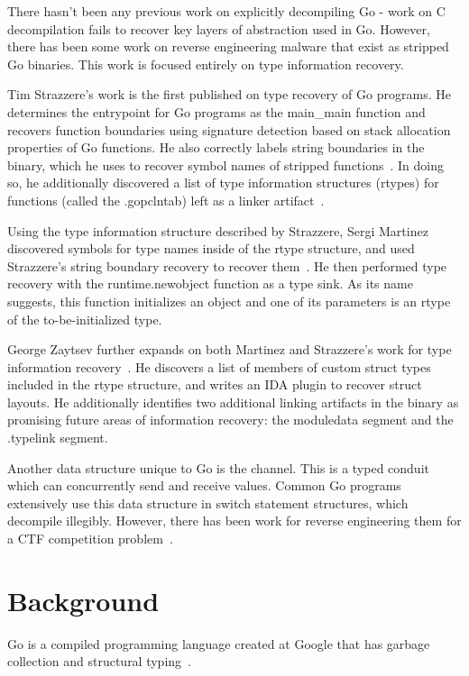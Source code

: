\documentclass[letterpaper,twocolumn,10pt]{article}
\begin{document}
There hasn’t been any previous work on explicitly decompiling Go - work on C decompilation fails to recover key layers of abstraction used in Go. However, there has been some work on reverse engineering malware that exist as stripped Go binaries. This work is focused entirely on type information recovery.

Tim Strazzere’s work is the first published on type recovery of Go programs. He determines the entrypoint for Go programs as the main\_main function and recovers function boundaries using signature detection based on stack allocation properties of Go functions. He also correctly labels string boundaries in the binary, which he uses to recover symbol names of stripped functions~\cite{rednaga}. In doing so, he additionally discovered a list of type information structures (rtypes) for functions (called the .gopclntab) left as a linker artifact~\cite{bsides}.

Using the type information structure described by Strazzere, Sergi Martinez discovered symbols for type names inside of the rtype structure, and used Strazzere’s string boundary recovery to recover them~\cite{martinez}. He then performed type recovery with the runtime.newobject function as a type sink. As its name suggests, this function initializes an object and one of its parameters is an rtype of the to-be-initialized type. 

George Zaytsev further expands on both Martinez and Strazzere’s work for type information recovery~\cite{zeronights}. He discovers a list of members of custom struct types included in the rtype structure, and writes an IDA plugin to recover struct layouts. He additionally identifies two additional linking artifacts in the binary as promising future areas of information recovery: the moduledata segment and the .typelink segment.

Another data structure unique to Go is the channel. This is a typed conduit which can concurrently send and receive values. Common Go programs extensively use this data structure in switch statement structures, which decompile illegibly. However, there has been work for reverse engineering them for a CTF competition problem~\cite{inbincible}.

\section{Background}
Go is a compiled programming language created at Google that has garbage collection and structural typing~\cite{gobook}.
\end{document}
